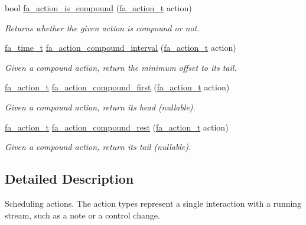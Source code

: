 \begin{DoxyCompactItemize}
bool \hyperlink{group___fa_action_ga20bae4d808d585cd087f7c3e55afbc0e}{fa\-\_\-action\-\_\-is\-\_\-compound} (\hyperlink{group___fa_action_gadb08ae063168671e5fedc6c23f20ae4b}{fa\-\_\-action\-\_\-t} action)
\begin{DoxyCompactList}\small\item\em Returns whether the given action is compound or not. \end{DoxyCompactList}\item 
\hyperlink{group___fa_time_ga227cc693f20b4873fed11028bcade184}{fa\-\_\-time\-\_\-t} \hyperlink{group___fa_action_gae40a7127067b85b0d72e17dea130b613}{fa\-\_\-action\-\_\-compound\-\_\-interval} (\hyperlink{group___fa_action_gadb08ae063168671e5fedc6c23f20ae4b}{fa\-\_\-action\-\_\-t} action)
\begin{DoxyCompactList}\small\item\em Given a compound action, return the minimum offset to its tail. \end{DoxyCompactList}\item 
\hyperlink{group___fa_action_gadb08ae063168671e5fedc6c23f20ae4b}{fa\-\_\-action\-\_\-t} \hyperlink{group___fa_action_ga9f3ee907773b33a7a9eea5c6d083db3b}{fa\-\_\-action\-\_\-compound\-\_\-first} (\hyperlink{group___fa_action_gadb08ae063168671e5fedc6c23f20ae4b}{fa\-\_\-action\-\_\-t} action)
\begin{DoxyCompactList}\small\item\em Given a compound action, return its head (nullable). \end{DoxyCompactList}\item 
\hyperlink{group___fa_action_gadb08ae063168671e5fedc6c23f20ae4b}{fa\-\_\-action\-\_\-t} \hyperlink{group___fa_action_ga0aa70790832784b192117ec043b34b57}{fa\-\_\-action\-\_\-compound\-\_\-rest} (\hyperlink{group___fa_action_gadb08ae063168671e5fedc6c23f20ae4b}{fa\-\_\-action\-\_\-t} action)
\begin{DoxyCompactList}\small\item\em Given a compound action, return its tail (nullable). \end{DoxyCompactList}\end{DoxyCompactItemize}


\subsection{Detailed Description}
Scheduling actions. The action types represent a single interaction with a running stream, such as a note or a control change.


